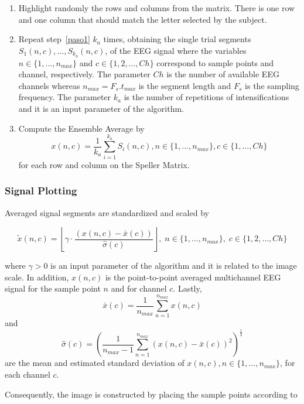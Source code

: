 \documentclass[utf8]{frontiersSCNS} %
\begin{document}
\begin{enumerate}
\item \label{paso1}Highlight randomly the rows and columns from the matrix.  There is one row and one column that should match the letter selected by the subject.
\item  \label{paso2} Repeat step~\ref{paso1} $k_a$ times, obtaining the single trial segments $S_1(n,c),\dots,S_{k_a}(n,c)$, of the EEG signal where the variables $n \in \{1, \dots, n_{max}\}$ and $c \in \{1,2,\dots,Ch\}$ correspond to sample points and channel, respectively. The parameter $Ch$ is the number of available EEG channels whereas $n_{max}=F_s.t_{max}$ is the segment length and $F_s$ is the sampling frequency.  The parameter $k_a$ is the number of repetitions of intensifications and it is an input parameter of the algorithm.
\item \label{paso3} Compute the Ensemble Average by
\begin{equation}
x(n,c)= \frac{1}{k_a}\sum_{i=1}^{k_a}S_i(n,c),n \in \{1, \dots, n_{max}\}, c \in \{1,\dots,Ch\}
\label{averaging}
\end{equation}  
for each row and column on the Speller Matrix. 
\end{enumerate}

\subsubsection{Signal Plotting} \label{Plot}

Averaged signal segments are standardized and scaled by 

\begin{equation}
\tilde{x}(n,c) = \left \lfloor{ \gamma \cdot \frac{( x(n,c) - \bar{x}(c)  )}{ \hat{\sigma}(c) } }\right \rfloor, \; n \in \{ 1, \dots, n_{max}\},\; c \in \{1,2,\dots,Ch\}
\label{eq:standarizedaverages}
\end{equation}

\noindent where $\gamma > 0$ is an input parameter of the algorithm and  it is related to the image scale. In addition, $ x(n,c) $ is the point-to-point averaged multichannel EEG signal for the sample point $n$ and for channel $c$. Lastly, $$\bar{x}(c) =\frac{1}{n_{max}}\sum_{n=1}^{n_{max}}x(n,c)$$ and $$ \hat{\sigma}(c) = (\frac{1}{n_{max}-1}\sum_{n=1}^{n_{max}}(x(n,c)-\bar{x}(c))^2 )^{\frac{1}{2}}$$ are the mean and estimated standard deviation of $x(n,c), n \in \{1,\dots,n_{max}\} $, for each channel $c$.

Consequently, the image is constructed by placing the sample points according to
\end{document}
